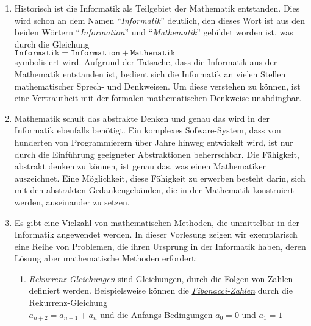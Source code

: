 \begin{enumerate}
\item Historisch ist die Informatik als Teilgebiet der Mathematik entstanden.  Dies wird schon an
      dem Namen  ``\emph{Informatik}''  deutlich, den dieses Wort ist aus den beiden W\"{o}rtern
      ``\emph{Information}'' und ``\emph{Mathematik}'' gebildet worden ist, was  
      durch die Gleichung 
      \\[0.2cm]
      \hspace*{1.3cm}
      $\texttt{Informatik} = \texttt{Information} + \texttt{Mathematik}$
      \\[0.2cm]
      symbolisiert wird.  Aufgrund der Tatsache, dass die Informatik aus der Mathematik entstanden
      ist, bedient sich die Informatik an vielen Stellen
      mathematischer Sprech- und Denkweisen.  Um diese verstehen zu k\"{o}nnen, ist eine 
      Vertrautheit mit der formalen mathematischen Denkweise unabdingbar.
\item Mathematik schult das abstrakte Denken und genau das wird in der Informatik ebenfalls
      ben\"{o}tigt.  Ein komplexes Sofware-System, dass von hunderten von Programmierern \"{u}ber Jahre
      hinweg entwickelt wird, ist nur durch die Einf\"{u}hrung geeigneter Abstraktionen beherrschbar.
      Die F\"{a}higkeit, abstrakt denken zu k\"{o}nnen, ist genau das, was einen Mathematiker auszeichnet.
      Eine M\"{o}glichkeit,  diese F\"{a}higkeit zu erwerben besteht darin, sich mit den abstrakten
      Gedankengeb\"{a}uden, die in der Mathematik konstruiert werden, auseinander zu setzen.
\item Es gibt eine Vielzahl von mathematischen Methoden, die unmittelbar in der Informatik
      angewendet werden.  In dieser Vorlesung zeigen wir exemplarisch eine Reihe von Problemen, die
      ihren Ursprung in der Informatik haben, deren L\"{o}sung aber mathematische Methoden erfordert:
      \begin{enumerate}
      \item \href{https://en.wikipedia.org/wiki/Recurrence_relation}{\emph{Rekurrenz-Gleichungen}}
            sind Gleichungen, durch die Folgen von Zahlen definiert werden.  Beispielsweise k\"{o}nnen die
            \href{https://de.wikipedia.org/wiki/Fibonacci-Folge}{\emph{Fibonacci-Zahlen}} durch die
            Rekurrenz-Gleichung 
            \\[0.2cm]
            \hspace*{1.3cm}
            $a_{n+2} = a_{n+1} + a_n$  \quad und die Anfangs-Bedingungen $a_0 = 0$ und $a_1 = 1$

\end{enumerate}
\end{enumerate}
